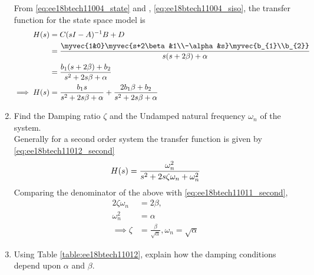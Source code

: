 \begin{enumerate}[label=\thesubsection.\arabic*.,ref=\thesubsection.\theenumi]
\solution From \eqref{eq:ee18btech11004_state} and ,
%
\eqref{eq:ee18btech11004_siso}, 
the transfer function for the state space model is
\begin{align}
H(s) &= C(sI - A)^{-1}B + D
\\
& = \frac
{
\myvec{1&0}\myvec{s+2\beta&1\\-\alpha&s}\myvec{b_{1}\\b_{2}}
}
{
s(s+2\beta) + \alpha
}
\\
&= {\frac{b_{1}(s+2\beta) + b_{2}}{s^{2}+2s\beta+\alpha}}
\\
   \implies H(s) &= {\frac{b_{1}s}{s^{2}+2s\beta+\alpha}} + \LARGE{\frac{2b_{1}\beta + b_{2}}{s^{2}+2s\beta+\alpha}}
\label{eq:ee18btech11011_second}
\end{align}
%
\item Find the Damping ratio $\zeta$ and the Undamped natural frequency $\omega_{n}$ of the system.
\\
\solution Generally for a second order system the transfer function is given by \ref{eq:ee18btech11012_second}
%
\begin{align}
H(s) = \LARGE{\frac{\omega_{n}^2}{s^{2}+2s\zeta\omega_{n}+\omega_{n}^2}}
\end{align}
%
Comparing the denominator of the above with \eqref{eq:ee18btech11011_second},
%
\begin{align}
2\zeta\omega_{n} &= 2\beta,
\\
\omega_{n}^2 &= \alpha
\\
\implies \zeta &= \frac{\beta}{\sqrt{\alpha}} , \omega_{n} = \sqrt{\alpha}
\label{eq:ee18btech11011_alphabeta}
\end{align}
%
\item Using Table \ref{table:ee18btech11012}, explain how the damping conditions depend upon $\alpha$ and  $\beta$.


\end{enumerate}
